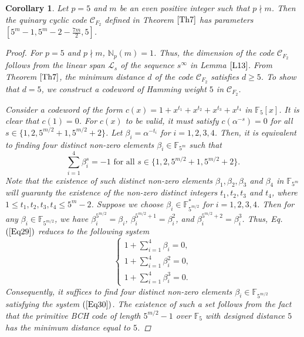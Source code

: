 \documentclass[pdflatex,sn-mathphys-num]{sn-jnl}%
\theoremstyle{thmstyleone}%
\newtheorem{corollary}{Corollary}%
\theoremstyle{thmstyletwo}%
\theoremstyle{thmstylethree}%
\begin{document}
\begin{corollary}\label{cor1}
    Let $p=5$ and $m$ be an even positive integer such that $p\nmid m$. Then the quinary cyclic code $\mathcal{C}_{F_{2}}$ defined in Theorem $\ref{Th7}$ has parameters $[5^m-1,5^{m}-2-\frac{7m}{2},5]$.
    \begin{proof}
        For $p=5$ and $p\nmid m$, $\mathbb{N}_{p}(m)=1$. Thus, the dimension of the code $\mathcal{C}_{F_{2}}$ follows from the linear span $\mathcal{L}_{s}$ of the sequence $s^{\infty}$ in Lemma $\ref{L13}$. From Theorem $\ref{Th7}$, the minimum distance $d$ of the code $\mathcal{C}_{F_{2}}$ satisfies $d\geq 5$. To show that $d=5$, we construct a codeword of Hamming weight $5$ in $\mathcal{C}_{F_{2}}$.
        \par Consider a codeword of the form $c(x)=1+x^{t_{1}}+x^{t_{2}}+x^{t_{3}}+x^{t_{4}}$ in $\mathbb{F}_{5}[x]$. It is clear that $c(1)=0$. For $c(x)$ to be valid, it must satisfy $c(\alpha^{-s})=0$ for all $s\in\{1,2,5^{m/2}+1,5^{m/2}+2\}$. Let $\beta_{i}=\alpha^{-t_{i}}$ for $i=1,2,3,4$. Then, it is equivalent to finding four distinct non-zero elements $\beta_{i}\in\mathbb{F}_{5^m}$ such that 
        \begin{equation}\label{Eq29}
            \sum_{i=1}^{4}\beta_{i}^{s}=-1\text{ for all $s\in\{1,2,5^{m/2}+1,5^{m/2}+2\}$.}
        \end{equation}
        Note that the existence of such distinct non-zero elements $\beta_{1},\beta_{2},\beta_{3}$ and $\beta_{4}$ in $\mathbb{F}_{5^m}$ will guaranty the existence of the non-zero distinct integers $t_{1},t_{2},t_{3}$ and $t_{4}$, where $1\leq t_{1},t_{2},t_{3},t_{4}\leq 5^m-2$. Suppose we choose $\beta_{i}\in\mathbb{F}_{5^{m/2}}^{*}$ for $i=1,2,3,4$. Then for any $\beta_{i}\in\mathbb{F}_{5^{m/2}}$, we have $\beta_{i}^{5^{m/2}}=\beta_{i}$, $\beta_{i}^{5^{m/2}+1}=\beta_{i}^{2}$, and $\beta_{i}^{5^{m/2}+2}=\beta_{i}^{3}$. Thus, Eq. $(\ref{Eq29})$ reduces to the following system  
        \begin{equation}\label{Eq30}
            \begin{cases}
                1+\sum_{i=1}^{4}\beta_{i}=0, \\
                1+\sum_{i=1}^{4}\beta_{i}^{2}=0, \\
                1+\sum_{i=1}^{4}\beta_{i}^{3}=0.
            \end{cases}
        \end{equation}
        Consequently, it suffices to find four distinct non-zero elements $\beta_i \in \mathbb{F}_{5^{m/2}}$ satisfying the system $(\ref{Eq30})$. The existence of such a set follows from the fact that the primitive BCH code of length $5^{m/2}-1$ over $\mathbb{F}_{5}$ with designed distance $5$ has the minimum distance equal to $5$. 

\end{proof}
\end{corollary}
\end{document}
